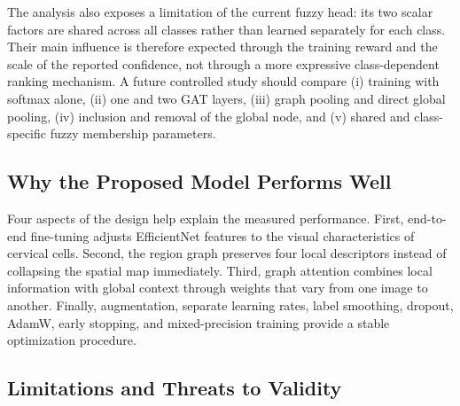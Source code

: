 \documentclass[10pt,conference]{IEEEtran}
\begin{document}
The analysis also exposes a limitation of the current fuzzy head: its two scalar factors are shared across all classes rather than learned separately for each class. Their main influence is therefore expected through the training reward and the scale of the reported confidence, not through a more expressive class-dependent ranking mechanism. A future controlled study should compare (i) training with softmax alone, (ii) one and two GAT layers, (iii) graph pooling and direct global pooling, (iv) inclusion and removal of the global node, and (v) shared and class-specific fuzzy membership parameters.

\subsection{Why the Proposed Model Performs Well}

Four aspects of the design help explain the measured performance. First, end-to-end fine-tuning adjusts EfficientNet features to the visual characteristics of cervical cells. Second, the region graph preserves four local descriptors instead of collapsing the spatial map immediately. Third, graph attention combines local information with global context through weights that vary from one image to another. Finally, augmentation, separate learning rates, label smoothing, dropout, AdamW, early stopping, and mixed-precision training provide a stable optimization procedure.

\subsection{Limitations and Threats to Validity}
\end{document}
